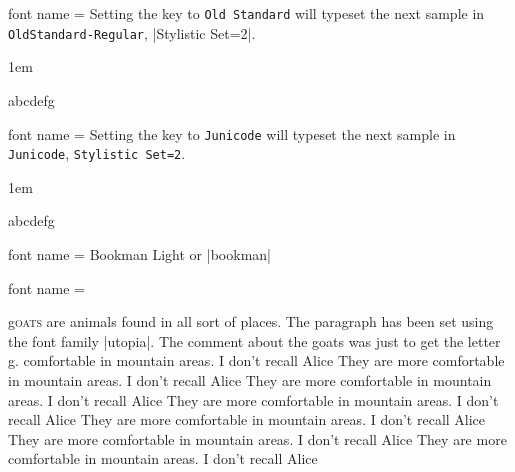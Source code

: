 \begin{docKey}[phd] {font name}{ = } {}
Setting the key to \texttt{Old Standard} will typeset the next sample in \texttt{OldStandard-Regular}, |Stylistic Set=2|. 

\bgroup
\parindent1em\itshape
{}

\aliceii

abcdefg
\egroup
\end{docKey}



\begin{docKey}[phd]{font name}{ = } {}
Setting the key to \texttt{Junicode} will typeset the next sample in \texttt{Junicode}, \texttt{Stylistic Set=2}. 

\bgroup
\parindent1em\itshape
{}

\aliceii

abcdefg
\egroup
\end{docKey}




\begin{docKey}[phd] {font name }{=} {}
Bookman Light or |bookman|
\end{docKey}

\bgroup
{}
\aliceiii
\egroup


\begin{docKey}[phd] {font name }{ =} {}

\end{docKey}

\bgroup
{}

\renewcommand{\LettrineFontHook}{\fontfamily{put}\fontseries{bx}}%
\par\leavevmode

\lettrine[lines=5, lhang=0.1,lraise=0.28,findent=1pt]{g}{oats} are animals found in all sort of places. The paragraph has been set using the font family |utopia|. The comment about the goats was just to get the letter g.
comfortable in mountain areas. I don't recall Alice  They are more
comfortable in mountain areas. I don't recall Alice  They are more
comfortable in mountain areas. I don't recall Alice  They are more
comfortable in mountain areas. I don't recall Alice  They are more
comfortable in mountain areas. I don't recall Alice  They are more
comfortable in mountain areas. I don't recall Alice  They are more
comfortable in mountain areas. I don't recall Alice 
\egroup


